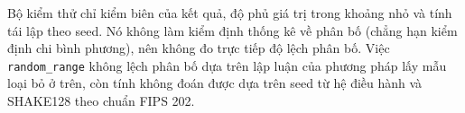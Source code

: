 Bộ kiểm thử chỉ kiểm biên của kết quả, độ phủ giá trị trong khoảng nhỏ và tính tái lập theo seed. Nó không làm kiểm định thống kê về phân bố (chẳng hạn kiểm định chi bình phương), nên không đo trực tiếp độ lệch phân bố. Việc \texttt{random\_range} không lệch phân bố dựa trên lập luận của phương pháp lấy mẫu loại bỏ ở trên, còn tính không đoán được dựa trên seed từ hệ điều hành và SHAKE128 theo chuẩn FIPS 202.
